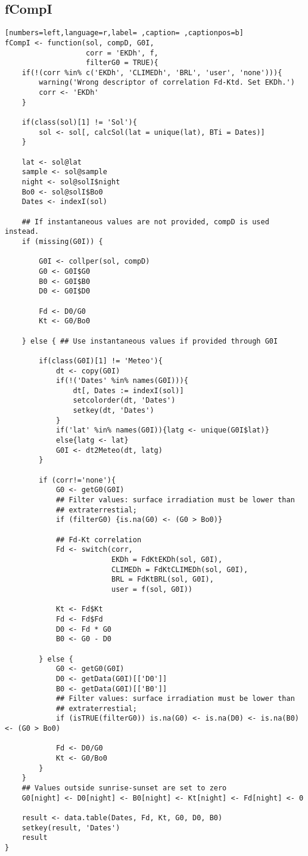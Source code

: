 \subsection{fCompI}
\label{sec:org3760a08}
\begin{lstlisting}[numbers=left,language=r,label= ,caption= ,captionpos=b]
fCompI <- function(sol, compD, G0I,
                   corr = 'EKDh', f,
                   filterG0 = TRUE){
    if(!(corr %in% c('EKDh', 'CLIMEDh', 'BRL', 'user', 'none'))){
        warning('Wrong descriptor of correlation Fd-Ktd. Set EKDh.')
        corr <- 'EKDh'
    }

    if(class(sol)[1] != 'Sol'){
        sol <- sol[, calcSol(lat = unique(lat), BTi = Dates)]
    }

    lat <- sol@lat
    sample <- sol@sample
    night <- sol@solI$night
    Bo0 <- sol@solI$Bo0
    Dates <- indexI(sol)

    ## If instantaneous values are not provided, compD is used instead.
    if (missing(G0I)) { 

        G0I <- collper(sol, compD)
        G0 <- G0I$G0
        B0 <- G0I$B0
        D0 <- G0I$D0

        Fd <- D0/G0
        Kt <- G0/Bo0

    } else { ## Use instantaneous values if provided through G0I

        if(class(G0I)[1] != 'Meteo'){
            dt <- copy(G0I)
            if(!('Dates' %in% names(G0I))){
                dt[, Dates := indexI(sol)]
                setcolorder(dt, 'Dates')
                setkey(dt, 'Dates')
            }
            if('lat' %in% names(G0I)){latg <- unique(G0I$lat)}
            else{latg <- lat}
            G0I <- dt2Meteo(dt, latg)
        }

        if (corr!='none'){
            G0 <- getG0(G0I)
            ## Filter values: surface irradiation must be lower than
            ## extraterrestial; 
            if (filterG0) {is.na(G0) <- (G0 > Bo0)}

            ## Fd-Kt correlation
            Fd <- switch(corr,
                         EKDh = FdKtEKDh(sol, G0I),
                         CLIMEDh = FdKtCLIMEDh(sol, G0I),
                         BRL = FdKtBRL(sol, G0I), 
                         user = f(sol, G0I))

            Kt <- Fd$Kt
            Fd <- Fd$Fd
            D0 <- Fd * G0
            B0 <- G0 - D0

        } else { 
            G0 <- getG0(G0I)
            D0 <- getData(G0I)[['D0']]
            B0 <- getData(G0I)[['B0']]
            ## Filter values: surface irradiation must be lower than
            ## extraterrestial; 
            if (isTRUE(filterG0)) is.na(G0) <- is.na(D0) <- is.na(B0) <- (G0 > Bo0)

            Fd <- D0/G0
            Kt <- G0/Bo0
        }
    }
    ## Values outside sunrise-sunset are set to zero
    G0[night] <- D0[night] <- B0[night] <- Kt[night] <- Fd[night] <- 0

    result <- data.table(Dates, Fd, Kt, G0, D0, B0)
    setkey(result, 'Dates')
    result
}
\end{lstlisting}
